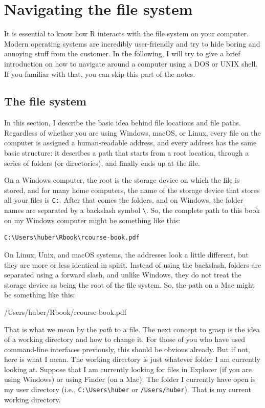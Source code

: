 \documentclass[
  12pt,
  oneside]{book}
\theoremstyle{definition}
\theoremstyle{definition}
\theoremstyle{definition}
\theoremstyle{definition}
\theoremstyle{remark}
\begin{document}
\hypertarget{sec:navigation}{%
\section{Navigating the file system}\label{sec:navigation}}

It is essential to know how R interacts with the file system on your computer. Modern operating systems are incredibly user-friendly and try to hide boring and annoying stuff from the customer. In the following, I will try to give a brief introduction on how to navigate around a computer using a DOS or UNIX shell. If you familiar with that, you can skip this part of the notes.

\hypertarget{sec:filesystem}{%
\subsection{The file system}\label{sec:filesystem}}

In this section, I describe the basic idea behind file locations and file paths. Regardless of whether you are using Windows, macOS, or Linux, every file on the computer is assigned a human-readable address, and every address has the same basic structure: it describes a path that starts from a root location, through a series of folders (or directories), and finally ends up at the file.

On a Windows computer, the root is the storage device on which the file is stored, and for many home computers, the name of the storage device that stores all your files is \texttt{C:}. After that comes the folders, and on Windows, the folder names are separated by a backslash symbol \texttt{\textbackslash{}}. So, the complete path to this book on my Windows computer might be something like this:

\begin{verbatim}
C:\Users\huber\Rbook\rcourse-book.pdf
\end{verbatim}

On Linux, Unix, and macOS systems, the addresses look a little different, but they are more or less identical in spirit. Instead of using the backslash, folders are separated using a forward slash, and unlike Windows, they do not treat the storage device as being the root of the file system. So, the path on a Mac might be something like this:

/Users/huber/Rbook/rcourse-book.pdf

That is what we mean by the \emph{path} to a file. The next concept to grasp is the idea of a working directory and how to change it. For those of you who have used command-line interfaces previously, this should be obvious already. But if not, here is what I mean. The working directory is just whatever folder I am currently looking at. Suppose that I am currently looking for files in Explorer (if you are using Windows) or using Finder (on a Mac). The folder I currently have open is my user directory (i.e., \texttt{C:\textbackslash{}Users\textbackslash{}huber} or \texttt{/Users/huber}). That is my current working directory.
\end{document}
